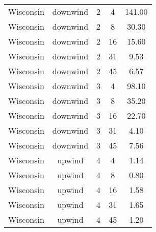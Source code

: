 \documentclass{article}
\begin{document}
\begin{longtable}[H]{ccccc}
Wisconsin & downwind  & 2        & 4            & 141.00                  \\
Wisconsin & downwind  & 2        & 8            & 30.30                   \\
Wisconsin & downwind  & 2        & 16           & 15.60                   \\
Wisconsin & downwind  & 2        & 31           & 9.53                    \\
Wisconsin & downwind  & 2        & 45           & 6.57                    \\
Wisconsin & downwind  & 3        & 4            & 98.10                   \\
Wisconsin & downwind  & 3        & 8            & 35.20                   \\
Wisconsin & downwind  & 3        & 16           & 22.70                   \\
Wisconsin & downwind  & 3        & 31           & 4.10                    \\
Wisconsin & downwind  & 3        & 45           & 7.56                    \\
Wisconsin & upwind    & 4        & 4            & 1.14                    \\
Wisconsin & upwind    & 4        & 8            & 0.80                    \\
Wisconsin & upwind    & 4        & 16           & 1.58                    \\
Wisconsin & upwind    & 4        & 31           & 1.65                    \\
Wisconsin & upwind    & 4        & 45           & 1.20                    \\ \hline
\end{longtable}


\pagebreak
\end{document}
